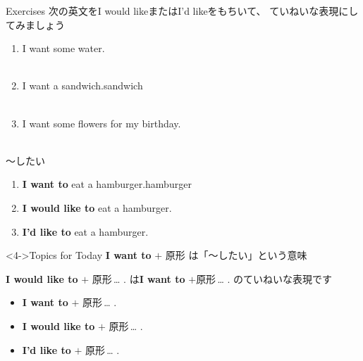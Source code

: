 \documentclass[aspectratio=169,xcolor={dvipsnames,table}]{beamer}
\begin{document}
\begin{frame}[plain]{Exercises}
次の英文をI would likeまたはI'd likeをもちいて、 ていねいな表現にしてみましょう
 \begin{enumerate}
  \item I want some water.\\
\\
  \item I want a sandwich.\hfill{\scriptsize sandwich }\\
\\
  \item I want some flowers for my birthday.\\
\\
 \end{enumerate}

\hfill{\scriptsize {}}

\end{frame}
\begin{frame}[plain]{～したい}
\large
 \begin{enumerate}
  \item<1-> \textbf{I want to} eat a hamburger.\hfill{\scriptsize hamburger }
  \item<2-> \textbf{I would like to} eat a hamburger.\hfill{\scriptsize {}}
  \item<3-> {\bfseries I'd like to} eat a hamburger.
 \end{enumerate}

\begin{block}<4->{Topics for Today}\small
\textbf{I want to} $+$ 原形\,\,は「～したい」という意味

\textbf{I would like to} $+$ 原形\,\ldots\,\,.\,\,は\textbf{I want to} $+$原形\,\ldots\,\,.\,\,のていねいな表現です
\begin{itemize}[square]\small
 \item \textbf{I want to} $+$ 原形\,\ldots\,\,.
 \item \textbf{I would like to} $+$ 原形\,\ldots\,\,.
 \item \textbf{I'd like to} $+$ 原形\,\ldots\,\,.
       \end{itemize}
\end{block}

\hfill{\scriptsize {}}

\end{frame}
\end{document}
